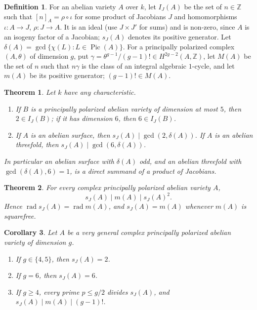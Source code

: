\documentclass[11pt,a4paper]{article}
\newtheorem{theorem}{Theorem}
\newtheorem{corollary}[theorem]{Corollary}
\theoremstyle{definition}
\newtheorem{definition}[lemma]{Definition}
\newcommand{\Z}{\mathbb{Z}}
\renewcommand{\IJ}{I_J}
\newcommand{\sJ}{s_J}
\newcommand{\Pic}{\operatorname{Pic}}
\newcommand{\rad}{\operatorname{rad}}
\begin{document}
\begin{definition}\label{def}
For an abelian variety $A$ over $k$, let $\IJ(A)$ be the set of $n\in\Z$
such that $[n]_A=\rho\circ\iota$ for some product of Jacobians $J$ and
homomorphisms $\iota\colon A\to J$, $\rho\colon J\to A$. It is an ideal
(use $J\times J'$ for sums) and is non-zero, since $A$ is an isogeny factor
of a Jacobian; $\sJ(A)$ denotes its positive generator. Let
$\delta(A)=\gcd\{\chi(L):L\in\Pic(A)\}$. For a principally polarized
complex $(A,\theta)$ of dimension $g$, put $\gamma=\theta^{g-1}/(g-1)!\in
H^{2g-2}(A,\Z)$, let $M(A)$ be the set of $n$ such that $n\gamma$ is the
class of an integral algebraic $1$-cycle, and let $m(A)$ be its positive
generator; $(g-1)!\in M(A)$.
\end{definition}

\begin{theorem}\label{thm:A}
Let $k$ have any characteristic.
\begin{enumerate}
\item[(a)] If $B$ is a principally polarized abelian variety of dimension at
most $5$, then $2\in\IJ(B)$; if it has dimension $6$, then $6\in\IJ(B)$.
\item[(b)] If $A$ is an abelian surface, then $\sJ(A)\mid\gcd(2,\delta(A))$.
If $A$ is an abelian threefold, then $\sJ(A)\mid\gcd(6,\delta(A))$.
\end{enumerate}
In particular an abelian surface with $\delta(A)$ odd, and an abelian
threefold with $\gcd(\delta(A),6)=1$, is a direct summand of a product of
Jacobians.
\end{theorem}

\begin{theorem}\label{thm:B}
For every complex principally polarized abelian variety $A$,
\[
\sJ(A)\mid m(A)\mid \sJ(A)^2 .
\]
Hence $\rad\sJ(A)=\rad m(A)$, and $\sJ(A)=m(A)$ whenever $m(A)$ is
squarefree.
\end{theorem}

\begin{corollary}\label{cor:C}
Let $A$ be a very general complex principally polarized abelian variety of
dimension $g$.
\begin{enumerate}
\item[(i)] If $g\in\{4,5\}$, then $\sJ(A)=2$.
\item[(ii)] If $g=6$, then $\sJ(A)=6$.
\item[(iii)] If $g\ge4$, every prime $p\le g/2$ divides $\sJ(A)$, and
$\sJ(A)\mid m(A)\mid (g-1)!$.
\end{enumerate}
\end{corollary}
\end{document}
